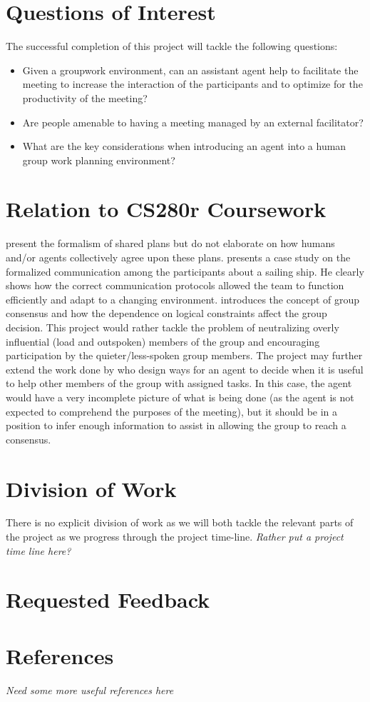 \documentclass[final,authoryear,11pt,times]{elsarticle}
\begin{document}
\section{Questions of Interest}
	\label{sec:question_o_i}
	The successful completion of this project will tackle the following questions:
	\begin{itemize}
		\item Given a groupwork environment, can an assistant agent help to facilitate the meeting to increase the interaction of the participants and to optimize for the productivity of the meeting?
		\item Are people amenable to having a meeting managed by an external facilitator?
		\item What are the key considerations when introducing an agent into a human group work planning environment?
	\end{itemize}

\section{Relation to CS280r Coursework}
	\label{sec:coursework}
	\citet{grosz2006dynamics} present the formalism of shared plans but do not elaborate on how humans and/or agents collectively agree upon these plans. \citet{hutchins1995cognition} presents a case study on the formalized communication among the participants about a sailing ship. He clearly shows how the correct communication protocols allowed the team to function efficiently and adapt to a changing environment. \citet{friedkin2016network} introduces the concept of group consensus and how the dependence on logical constraints affect the group decision. This project would rather tackle the problem of neutralizing overly influential (load and outspoken) members of the group and encouraging participation by the quieter/less-spoken group members. The project may further extend the work done by \citet{kamar2009incorporating} who design ways for an agent to decide when it is useful to help other members of the group with assigned tasks. In this case, the agent would have a very incomplete picture of what is being done (as the agent is not expected to comprehend the purposes of the meeting), but it should be in a position to infer enough information to assist in allowing the group to reach a consensus.

\section{Division of Work}
	\label{sec:requestedfeedback}
	There is no explicit division of work as we will both tackle the relevant parts of the project as we progress through the project time-line. \textit{Rather put a project time line here?}

\section{Requested Feedback}
	\label{sec:requestedfeedback}

\section{References}
\textit{Need some more useful references here}


\end{document}

